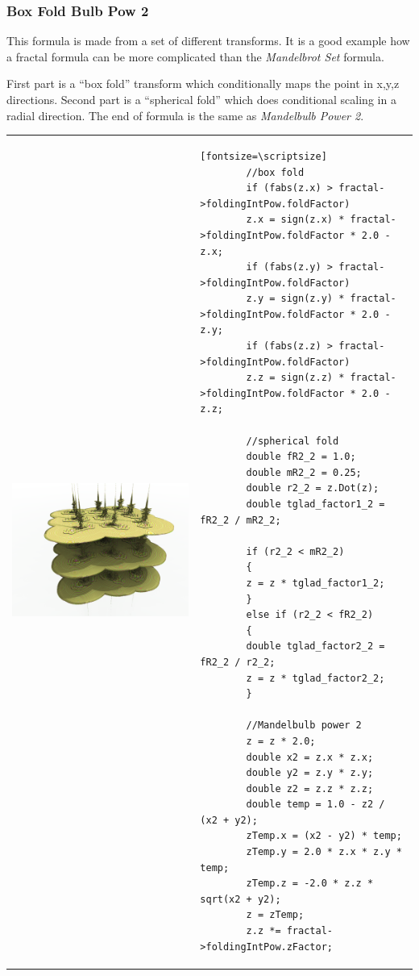 \subsubsection{Box Fold Bulb Pow 2}
\nopagebreak

This formula is made from a set of different transforms. It is a good example
how a fractal formula can be more complicated than the
\emph{Mandelbrot Set} formula.

First part is a ``box fold'' transform which conditionally maps the point in x,y,z  directions. Second part is a ``spherical fold'' which does conditional scaling in a radial direction.
The end of formula is the same as \emph{Mandelbulb Power 2}. \nopagebreak

\begin{tabular}{l l}
	\includegraphics[width=0.3\linewidth]{img/manual/media/formula_box_fold_pwr2.png}	
	& 
	\begin{minipage}[b]{0.5\linewidth}
		\begin{verbatim}[fontsize=\scriptsize]
		//box fold
		if (fabs(z.x) > fractal->foldingIntPow.foldFactor)
		z.x = sign(z.x) * fractal->foldingIntPow.foldFactor * 2.0 - z.x;
		if (fabs(z.y) > fractal->foldingIntPow.foldFactor)
		z.y = sign(z.y) * fractal->foldingIntPow.foldFactor * 2.0 - z.y;
		if (fabs(z.z) > fractal->foldingIntPow.foldFactor)
		z.z = sign(z.z) * fractal->foldingIntPow.foldFactor * 2.0 - z.z;
		
		//spherical fold
		double fR2_2 = 1.0;
		double mR2_2 = 0.25;
		double r2_2 = z.Dot(z);
		double tglad_factor1_2 = fR2_2 / mR2_2;
		
		if (r2_2 < mR2_2)
		{
		z = z * tglad_factor1_2;
		}
		else if (r2_2 < fR2_2)
		{
		double tglad_factor2_2 = fR2_2 / r2_2;
		z = z * tglad_factor2_2;
		}
		
		//Mandelbulb power 2
		z = z * 2.0;
		double x2 = z.x * z.x;
		double y2 = z.y * z.y;
		double z2 = z.z * z.z;
		double temp = 1.0 - z2 / (x2 + y2);
		zTemp.x = (x2 - y2) * temp;
		zTemp.y = 2.0 * z.x * z.y * temp;
		zTemp.z = -2.0 * z.z * sqrt(x2 + y2);
		z = zTemp;
		z.z *= fractal->foldingIntPow.zFactor;
		\end{verbatim}
	\end{minipage}
\end{tabular} 

